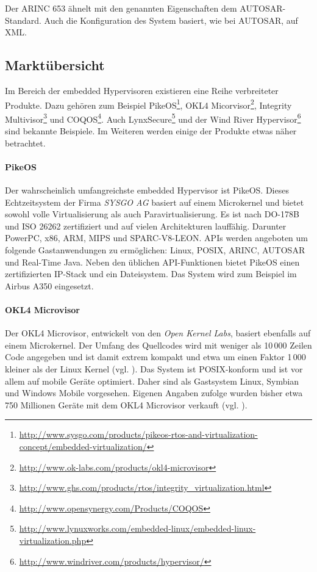 \documentclass[
  a4paper,					    %
  twoside,
  DIV=calc,     				%
  bibliography=totoc,
  cleardoublepage=empty,
  ngerman,     					%
  final       					%
]{scrbook}
\begin{document}
Der ARINC 653 ähnelt mit den genannten Eigenschaften dem AUTOSAR-Standard. Auch die Konfiguration des System basiert, wie bei AUTOSAR, auf XML.


\subsection{Marktübersicht}
Im Bereich der embedded Hypervisoren existieren eine Reihe verbreiteter Produkte. Dazu gehören zum Beispiel PikeOS\footnote{\url{http://www.sysgo.com/products/pikeos-rtos-and-virtualization-concept/embedded-virtualization/}}, OKL4 Micorvisor\footnote{\url{http://www.ok-labs.com/products/okl4-microvisor}}, Integrity Multivisor\footnote{\url{http://www.ghs.com/products/rtos/integrity_virtualization.html}} und COQOS\footnote{\url{http://www.opensynergy.com/Products/COQOS}}. Auch LynxSecure\footnote{\url{http://www.lynuxworks.com/embedded-linux/embedded-linux-virtualization.php}} und der Wind River Hypervisor\footnote{\url{http://www.windriver.com/products/hypervisor/}} sind bekannte Beispiele. Im Weiteren werden einige der Produkte etwas näher betrachtet.

\paragraph{PikeOS}
Der wahrscheinlich umfangreichste embedded Hypervisor ist PikeOS. Dieses Echtzeitsystem der Firma \emph{SYSGO AG} basiert auf einem Microkernel und bietet sowohl volle Virtualisierung als auch Paravirtualisierung. Es ist nach DO-178B und ISO 26262 zertifiziert und auf vielen Architekturen lauffähig. Darunter PowerPC, x86, ARM, MIPS und SPARC-V8-LEON. APIs werden angeboten um folgende Gastanwendungen zu ermöglichen: Linux, POSIX, ARINC, AUTOSAR und Real-Time Java. Neben den üblichen API-Funktionen bietet PikeOS einen zertifizierten IP-Stack und ein Dateisystem. Das System wird zum Beispiel im Airbus A350 eingesetzt.

\paragraph{OKL4 Microvisor}
Der OKL4 Microvisor, entwickelt von den \emph{Open Kernel Labs}, basiert ebenfalls auf einem Microkernel. Der Umfang des Quellcodes wird mit weniger als 10\,000 Zeilen Code angegeben und ist damit extrem kompakt und etwa um einen Faktor 1\,000 kleiner als der Linux Kernel (vgl. \cite{wiki:loc}). Das System ist POSIX-konform und ist vor allem auf mobile Geräte optimiert. Daher sind als Gastsystem Linux, Symbian und Windows Mobile vorgesehen. Eigenen Angaben zufolge wurden bisher etwa 750 Millionen Geräte mit dem OKL4 Microvisor verkauft (vgl. \cite{okl4}).
\end{document}
